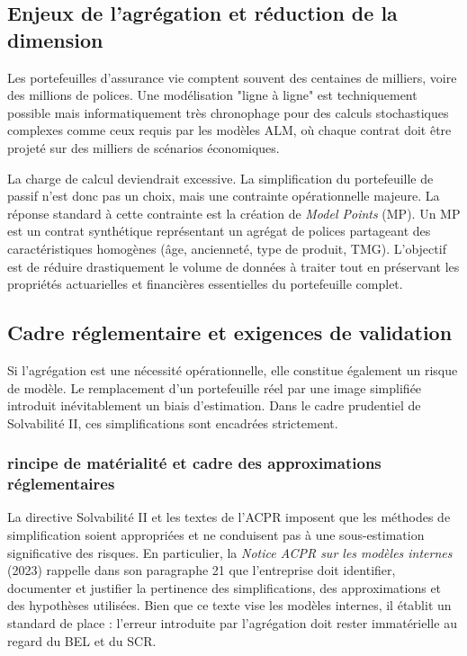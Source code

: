 \subsection{Enjeux de l'agrégation et réduction de la dimension}

Les portefeuilles d'assurance vie comptent souvent des centaines de milliers, voire des millions de polices. Une modélisation "ligne à ligne" est techniquement possible mais informatiquement très chronophage pour des calculs stochastiques complexes comme ceux requis par les modèles ALM, où chaque contrat doit être projeté sur des milliers de scénarios économiques.

La charge de calcul deviendrait excessive. La simplification du portefeuille de passif n'est donc pas un choix, mais une contrainte opérationnelle majeure. La réponse standard à cette contrainte est la création de \textit{Model Points} (MP). Un MP est un contrat synthétique représentant un agrégat de polices partageant des caractéristiques homogènes (âge, ancienneté, type de produit, TMG). L'objectif est de réduire drastiquement le volume de données à traiter tout en préservant les propriétés actuarielles et financières essentielles du portefeuille complet.

\subsection{Cadre réglementaire et exigences de validation}

Si l'agrégation est une nécessité opérationnelle, elle constitue également un risque de modèle. Le remplacement d'un portefeuille réel par une image simplifiée introduit inévitablement un biais d'estimation. Dans le cadre prudentiel de Solvabilité II, ces simplifications sont encadrées strictement.

\subsubsection{rincipe de matérialité et cadre des approximations réglementaires}

La directive Solvabilité II et les textes de l'ACPR imposent que les méthodes de simplification soient appropriées et ne conduisent pas à une sous-estimation significative des risques.
En particulier, la \textit{Notice ACPR sur les modèles internes} (2023) \cite{notice_acpr} rappelle dans son paragraphe 21 que l'entreprise doit \og identifier, documenter et justifier la pertinence des simplifications, des approximations et des hypothèses \fg   utilisées. Bien que ce texte vise les modèles internes, il établit un standard de place : l'erreur introduite par l'agrégation doit rester immatérielle au regard du BEL et du SCR.

